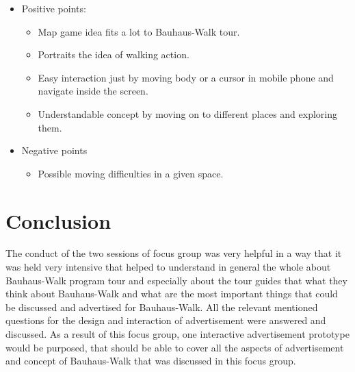 \begin {enumerate}
\begin {itemize}

\item{Positive points:} 
\begin {itemize}

\item	Map game idea fits a lot to Bauhaus-Walk tour.
\item	Portraits the idea of walking action.
\item	Easy interaction just by moving body or a cursor in mobile phone and navigate inside the screen.
\item	Understandable concept by moving on to different places and exploring them. 
\end {itemize}

\item{Negative points}
\begin {itemize}
\item Possible moving difficulties in a given space.
\end {itemize}
\end {itemize}
\end {enumerate}

\newpage
\section{Conclusion}
The conduct of the two sessions of focus group was very helpful in a way that it was held very intensive that helped to understand in general the whole about Bauhaus-Walk program tour and especially about the tour guides that what they think about Bauhaus-Walk and what are the most important things that could be discussed and advertised for Bauhaus-Walk. All the relevant mentioned questions for the design and interaction of advertisement were answered and discussed. As a result of this focus group, one interactive advertisement prototype would be purposed, that should be able to cover all the aspects of advertisement and concept of Bauhaus-Walk that was discussed in this focus group.

